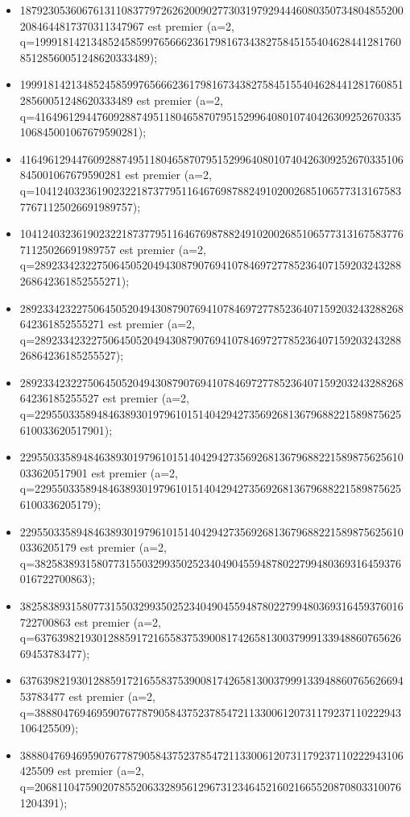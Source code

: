 \documentclass{article}
\begin{document}
\begin{itemize}
\item 187923053606761311083779726262009027730319792944460803507348048552002084644817370311347967 est premier (a=2,\\ q=1999181421348524585997656662361798167343827584515540462844128176085128560051248620333489);
\item 1999181421348524585997656662361798167343827584515540462844128176085128560051248620333489 est premier (a=2, q=41649612944760928874951180465870795152996408010740426309252670335106845001067679590281);
\item 41649612944760928874951180465870795152996408010740426309252670335106845001067679590281 est premier (a=2, q=1041240323619023221873779511646769878824910200268510657731316758377671125026691989757);
\item 1041240323619023221873779511646769878824910200268510657731316758377671125026691989757 est premier (a=2, q=28923342322750645052049430879076941078469727785236407159203243288268642361852555271);
\item 28923342322750645052049430879076941078469727785236407159203243288268642361852555271 est premier (a=2, q=2892334232275064505204943087907694107846972778523640715920324328826864236185255527);
\item 2892334232275064505204943087907694107846972778523640715920324328826864236185255527 est premier (a=2, q=22955033589484638930197961015140429427356926813679688221589875625610033620517901);
\item 22955033589484638930197961015140429427356926813679688221589875625610033620517901 est premier (a=2, q=229550335894846389301979610151404294273569268136796882215898756256100336205179);
\item 229550335894846389301979610151404294273569268136796882215898756256100336205179 est premier (a=2, q=38258389315807731550329935025234049045594878022799480369316459376016722700863);
\item 38258389315807731550329935025234049045594878022799480369316459376016722700863 est premier (a=2,\\ q=6376398219301288591721655837539008174265813003799913394886076562669453783477);
\item 6376398219301288591721655837539008174265813003799913394886076562669453783477 est premier (a=2,\\ q=38880476946959076778790584375237854721133006120731179237110222943106425509);
\item 38880476946959076778790584375237854721133006120731179237110222943106425509 est premier (a=2,\\ q=206811047590207855206332895612967312346452160216655208708033100761204391);

\end{itemize}
\end{document}
